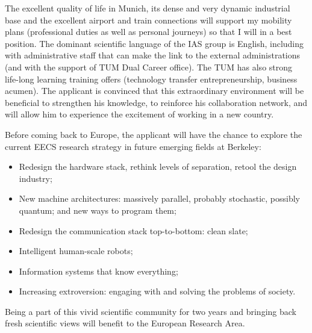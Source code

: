 The excellent  quality of life in  Munich, its
dense and very  dynamic industrial base and the  excellent airport and
train connections will support  my mobility plans (professional duties
as well as  personal journeys) so that I will in  a best position. The
dominant scientific  language of the IAS group  is English, including
with  administrative staff  that can  make  the link  to the  external
administrations (and with the support  of TUM Dual Career office). The
TUM  has also  strong life-long  learning training  offers (technology
transfer entrepreneurship, business acumen).   The applicant is convinced that this
extraordinary  environment   will  be  beneficial   to  strengthen  his
knowledge, to reinforce his collaboration network, and will allow him to
experience the excitement of working in a new country.

Before coming back to Europe, the applicant will have the chance to explore 
the current EECS research strategy in future emerging fields at Berkeley:
\begin{itemize}
\item Redesign the hardware stack, rethink levels of separation, retool the design industry;
\item New machine architectures: massively parallel, probably stochastic, possibly quantum; and new ways to program them;
\item Redesign the communication stack top-to-bottom: clean slate;
\item Intelligent human-scale robots;
\item Information systems that know everything;
\item Increasing extroversion: engaging with and solving the problems of society.
\end{itemize}
Being a part of this vivid scientific community for two years and bringing back fresh 
scientific views will benefit to the European Research Area.

